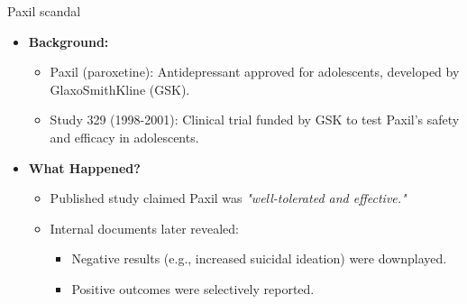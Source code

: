 \documentclass{beamer} %
\begin{document}
\begin{frame}{Paxil scandal}
    \begin{itemize}
        \item \textbf{Background:}
        \begin{itemize}
            \item Paxil (paroxetine): Antidepressant approved for adolescents, developed by GlaxoSmithKline (GSK).
            \item Study 329 (1998-2001): Clinical trial funded by GSK to test Paxil's safety and efficacy in adolescents.
        \end{itemize}
				
				\bigskip
        \item \textbf{What Happened?}
        \begin{itemize}
            \item Published study claimed Paxil was \textit{"well-tolerated and effective."}
            \item Internal documents later revealed:
            \begin{itemize}
                \item Negative results (e.g., increased suicidal ideation) were downplayed.
                \item Positive outcomes were selectively reported.
            \end{itemize}
        \end{itemize}
    \end{itemize}
\end{frame}
\end{document}
